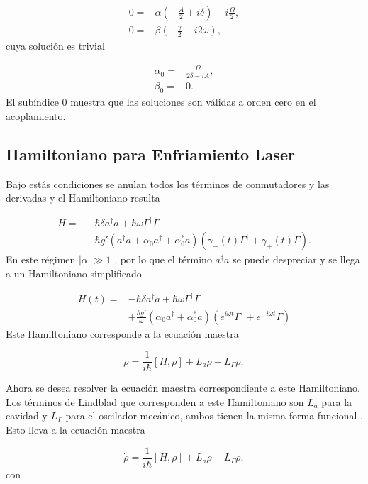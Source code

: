 \documentclass[10pt,a4paper]{report}
\begin{document}
\begin{align}
0 =& \alpha(-\frac{A}{2}+i\delta)-i\frac{\Omega}{2},\\
0 =& \beta(-\frac{\gamma}{2}-i 2\omega),
\end{align} cuya solución es trivial 

\begin{align}
\alpha_0 =& \frac{\Omega}{2\delta-iA},\\
\beta_0 =& 0.
\end{align} El subíndice 0 muestra que las soluciones son válidas a orden cero en el acoplamiento.

\subsection{Hamiltoniano para Enfriamiento Laser}

Bajo estás condiciones se anulan todos los términos de conmutadores y las derivadas y el Hamiltoniano resulta

\begin{align}
H =& -\hbar \delta a^{\dagger}a +\hbar\omega\Gamma^{\dagger}\Gamma \\
&-\hbar g'(a^{\dagger}a +\alpha_0 a^{\dagger}+\alpha^*_0 a)(\gamma_-(t)\Gamma^{\dagger}+\gamma_+(t)\Gamma)\nonumber.
\end{align} En este régimen $|\alpha| \gg 1$ \cite{BarberisLC}, por lo que el término $a^\dagger a$ se puede despreciar y se llega a un Hamiltoniano simplificado

\begin{align} \label{LCHamiltonian}
H(t) =& -\hbar \delta a^{\dagger}a +\hbar\omega\Gamma^{\dagger}\Gamma \\
&+\frac{\hbar g'}{\omega}(\alpha_0 a^{\dagger}+\alpha^*_0 a)(e^{i\omega t} \nonumber\Gamma^{\dagger}+e^{-i\omega t}\Gamma)
\end{align} Este Hamiltoniano corresponde a la ecuación maestra


\begin{equation}\label{LCMasterEq}
\dot{\rho} = \frac{1}{i\hbar}[H,\rho] +L_a\rho + L_\Gamma \rho,
\end{equation} 

Ahora se desea resolver la ecuación maestra correspondiente a este Hamiltoniano. Los términos de Lindblad que corresponden a este Hamiltoniano son $L_a$ para la cavidad y $L_\Gamma$ para el oscilador mecánico, ambos tienen la misma forma funcional \cite{ZollerQN}. Esto lleva a la ecuación maestra

\begin{equation}\label{LCMasterEquation}
\dot{\rho} = \frac{1}{i\hbar}[H,\rho] + L_a\rho + L_\Gamma \rho,
\end{equation} con
\end{document}
